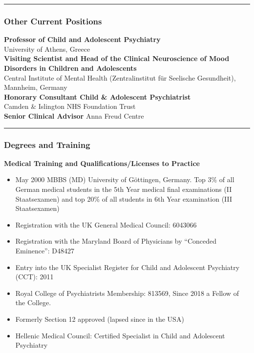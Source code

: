 \documentclass[
]{article}
\providecommand{\tightlist}{%
  \setlength{\itemsep}{0pt}\setlength{\parskip}{0pt}}
\begin{document}
\begin{center}\rule{0.5\linewidth}{0.5pt}\end{center}

\hypertarget{other-current-positions}{%
\subsubsection{Other Current Positions}\label{other-current-positions}}

\textbf{Professor of Child and Adolescent Psychiatry}\\
University of Athens, Greece\\
\textbf{Visiting Scientist and Head of the Clinical Neuroscience of Mood
Disorders in Children and Adolescents}\\
Central Institute of Mental Health (Zentralinstitut für Seelische
Gesundheit), Mannheim, Germany\\
\textbf{Honorary Consultant Child \& Adolescent Psychiatrist}\\
Camden \& Islington NHS Foundation Trust\\
\textbf{Senior Clinical Advisor} Anna Freud Centre

\begin{center}\rule{0.5\linewidth}{0.5pt}\end{center}

\hypertarget{degrees-and-training}{%
\subsubsection{Degrees and Training}\label{degrees-and-training}}

\textbf{Medical Training and Qualifications/Licenses to Practice}

\begin{itemize}
\tightlist
\item
  May 2000 MBBS (MD) University of Göttingen, Germany. Top 3\% of all
  German medical students in the 5th Year medical final examinations (II
  Staatsexamen) and top 20\% of all students in 6th Year examination
  (III Staatsexamen)
\item
  Registration with the UK General Medical Council: 6043066
\item
  Registration with the Maryland Board of Physicians by ``Conceded
  Eminence'': D48427
\item
  Entry into the UK Specialist Register for Child and Adolescent
  Psychiatry (CCT): 2011
\item
  Royal College of Psychiatrists Membership: 813569, Since 2018 a Fellow
  of the College.
\item
  Formerly Section 12 approved (lapsed since in the USA)
\item
  Hellenic Medical Council: Certified Specialist in Child and Adolescent
  Psychiatry
\end{itemize}
\end{document}
